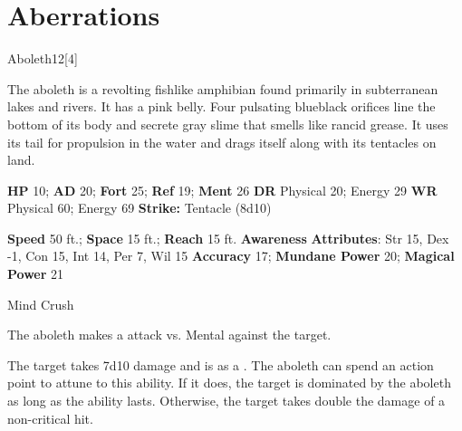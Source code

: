 
        \section{Aberrations}
      
  \begin{monsection}{Aboleth}{12}[4]
    \vspace{-1em}\vspace{-1em}
    \vspace{0em}

    
    The aboleth is a revolting fishlike amphibian found primarily in subterranean lakes and rivers.
    It has a pink belly.
    Four pulsating blueblack orifices line the bottom of its body and secrete gray slime that smells like rancid grease.
    It uses its tail for propulsion in the water and drags itself along with its tentacles on land.
  

    \begin{spellcontent}
      \begin{spelltargetinginfo}
        \pari \textbf{HP} 10;
          \textbf{AD} 20;
          \textbf{Fort} 25;
          \textbf{Ref} 19;
          \textbf{Ment} 26
        \pari \textbf{DR} Physical 20; Energy 29
        \pari \textbf{WR} Physical 60; Energy 69
        \pari \textbf{Strike:}
            Tentacle  (8d10)
      \end{spelltargetinginfo}
    \end{spellcontent}
    \begin{monsterfooter}
      \pari \textbf{Speed} 50 ft.;
        \textbf{Space} 15 ft.;
        \textbf{Reach} 15 ft.
      \pari \textbf{Awareness} 
      \pari \textbf{Attributes}:
        Str 15, Dex -1,
        Con 15, Int 14,
        Per 7, Wil 15
      \pari \textbf{Accuracy} 17;
        \textbf{Mundane Power} 20;
      \textbf{Magical Power} 21
    \end{monsterfooter}
  \end{monsection}
  \begin{freeability}{Mind Crush}
      
      The aboleth makes a  attack
        vs. Mental against the target.
    
    \hit The target takes 7d10  damage and is  as a .
    \crit 
          The aboleth can spend an action point to attune to this ability.
          If it does, the target is dominated by the aboleth as long as the ability lasts.
          Otherwise, the target takes double the damage of a non-critical hit.
    \end{freeability}
  

